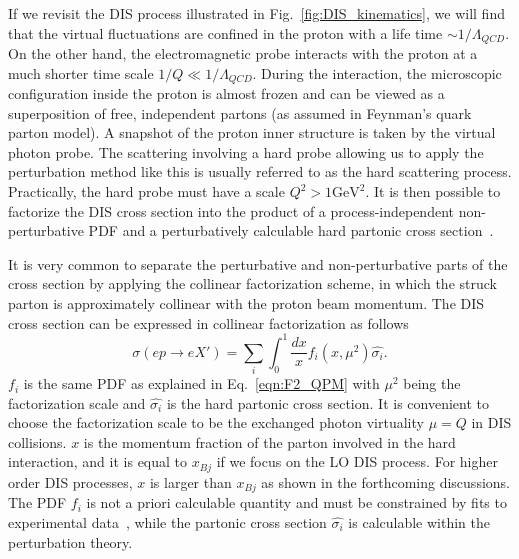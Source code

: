 If we revisit the DIS process illustrated in Fig.~\ref{fig:DIS_kinematics}, we
will find that the virtual fluctuations are confined in the proton with a life
time $\sim 1/\Lambda_{QCD}$. On the other hand, the electromagnetic probe
interacts with the proton at a much shorter time scale $1/Q \ll
1/\Lambda_{QCD}$. During the interaction, the microscopic configuration inside
the proton is almost frozen and can be viewed as a superposition of free,
independent partons (as assumed in Feynman's quark parton model). A snapshot of
the proton inner structure is taken by the virtual photon probe. The scattering
involving a hard probe allowing us to apply the perturbation method like this is
usually referred to as the hard scattering process. Practically, the hard probe
must have a scale $Q^{2}>1 \mathrm{GeV}^{2}$. It is then possible to factorize
the DIS cross section into the product of a process-independent non-perturbative
PDF and a perturbatively calculable hard partonic cross
section~\cite{Sterman:1995fz}.

It is very common to separate the perturbative and non-perturbative parts of the
cross section by applying the collinear factorization scheme, in which the
struck parton is approximately collinear with the proton beam momentum. The DIS
cross section can be expressed in collinear factorization as follows
\begin{equation}
\sigma(ep\rightarrow eX')=\sum_{i} \int^{1}_{0}\frac{dx}{x}f_{i}(x,\mu^{2})\hat{\sigma_{i}}.
\label{eqn:coll_factor}
\end{equation}
$f_{i}$ is the same PDF as explained in Eq.~\ref{eqn:F2_QPM} with $\mu^{2}$
being the factorization scale and $\hat{\sigma_{i}}$ is the hard partonic cross
section. It is convenient to choose the factorization scale to be the exchanged
photon virtuality $\mu=Q$ in DIS collisions. $x$ is the momentum fraction of the
parton involved in the hard interaction, and it is equal to $x_{Bj}$ if we focus on
the LO DIS process. For higher order DIS processes, $x$ is larger than $x_{Bj}$ as
shown in the forthcoming discussions. The PDF $f_{i}$ is not a priori calculable quantity
and must be constrained by fits to experimental data~\cite{Aaron:2009aa}, while
the partonic cross section $\hat{\sigma_{i}}$ is calculable within the
perturbation theory.


